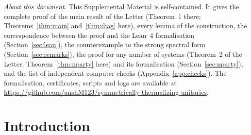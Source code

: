 \documentclass[11pt]{amsart}
\theoremstyle{definition}
\theoremstyle{remark}
\numberwithin{equation}{section}
\begin{document}
\maketitle

\noindent\emph{About this document.} This Supplemental Material is self-contained. It gives the complete
proof of the main result of the Letter (Theorem~1 there; Theorems~\ref{thm:main} and~\ref{thm:diag} here),
every lemma of the construction, the correspondence between the proof and the Lean~4 formalisation
(Section~\ref{sec:lean}), the counterexample to the strong spectral form (Section~\ref{sec:remarks}), the proof for any number of systems (Theorem~2 of the Letter;
Theorem~\ref{thm:nparty} here) and its formalisation (Section~\ref{sec:nparty}), and the list of
independent computer checks (Appendix~\ref{app:checks}). The formalisation, certificates, scripts and logs are
available at \url{https://github.com/anshM123/symmetrically-thermalizing-unitaries}.

\tableofcontents

\section{Introduction}\label{sec:intro}
\end{document}
